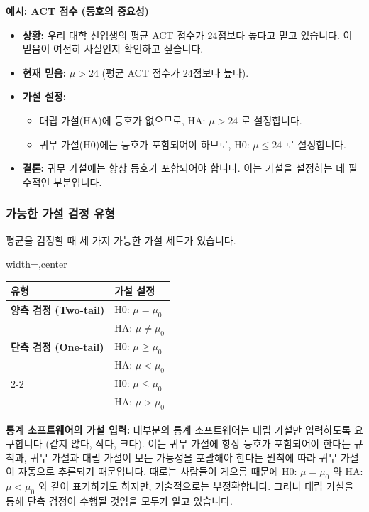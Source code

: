 \documentclass[11pt,a4paper]{article}
\begin{document}
\begin{examplebox}
\textbf{예시: ACT 점수 (등호의 중요성)}
\begin{itemize}
    \item \textbf{상황:} 우리 대학 신입생의 평균 ACT 점수가 24점보다 높다고 믿고 있습니다. 이 믿음이 여전히 사실인지 확인하고 싶습니다.
    \item \textbf{현재 믿음:} $\mu > 24$ (평균 ACT 점수가 24점보다 높다).
    \item \textbf{가설 설정:}
        \begin{itemize}
            \item 대립 가설(HA)에 등호가 없으므로, HA: $\mu > 24$ 로 설정합니다.
            \item 귀무 가설(H0)에는 등호가 포함되어야 하므로, H0: $\mu \le 24$ 로 설정합니다.
        \end{itemize}
    \item \textbf{결론:} 귀무 가설에는 항상 등호가 포함되어야 합니다. 이는 가설을 설정하는 데 필수적인 부분입니다.
\end{itemize}
\end{examplebox}

\subsubsection*{가능한 가설 검정 유형}

평균을 검정할 때 세 가지 가능한 가설 세트가 있습니다.

\begin{adjustbox}{width=\textwidth,center}
\begin{tabular}{ll}
\toprule
\textbf{유형} & \textbf{가설 설정} \\
\midrule
\textbf{양측 검정 (Two-tail)} & H0: $\mu = \mu_0$ \\
& HA: $\mu \ne \mu_0$ \\
\midrule
\textbf{단측 검정 (One-tail)} & H0: $\mu \ge \mu_0$ \\
& HA: $\mu < \mu_0$ \\
\cmidrule{2-2}
& H0: $\mu \le \mu_0$ \\
& HA: $\mu > \mu_0$ \\
\bottomrule
\end{tabular}
\end{adjustbox}
\label{tab:hypothesis_types}

\begin{cautionbox}
\textbf{통계 소프트웨어의 가설 입력:}
대부분의 통계 소프트웨어는 대립 가설만 입력하도록 요구합니다 (같지 않다, 작다, 크다).
이는 귀무 가설에 항상 등호가 포함되어야 한다는 규칙과, 귀무 가설과 대립 가설이 모든 가능성을 포괄해야 한다는 원칙에 따라 귀무 가설이 자동으로 추론되기 때문입니다.
때로는 사람들이 게으름 때문에 H0: $\mu = \mu_0$ 와 HA: $\mu < \mu_0$ 와 같이 표기하기도 하지만, 기술적으로는 부정확합니다. 그러나 대립 가설을 통해 단측 검정이 수행될 것임을 모두가 알고 있습니다.
\end{cautionbox}
\end{document}
